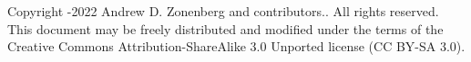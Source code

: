 Copyright -2022 Andrew D. Zonenberg and contributors.. All rights reserved. \\

This document may be freely distributed and modified under the terms of the Creative Commons Attribution-ShareAlike 3.0
Unported license (CC BY-SA 3.0).
